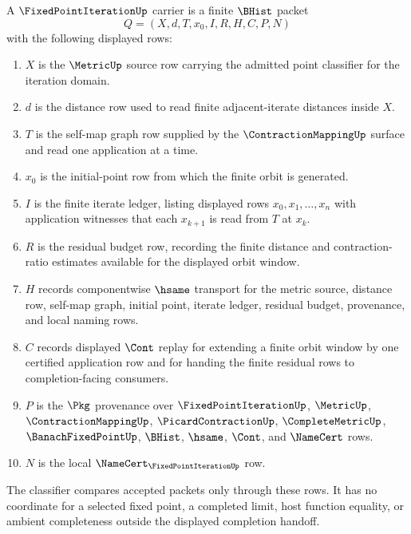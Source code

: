 \begin{definition}
\label{def:fixed-point-iteration-carrier}
A $\FixedPointIterationUp$ carrier is a finite $\BHist$ packet
$$
Q=(X,d,T,x_0,I,R,H,C,P,N)
$$
with the following displayed rows:
\begin{enumerate}
\item $X$ is the $\MetricUp$ source row carrying the admitted point classifier for the iteration domain.
\item $d$ is the distance row used to read finite adjacent-iterate distances inside $X$.
\item $T$ is the self-map graph row supplied by the $\ContractionMappingUp$ surface and read one application at a time.
\item $x_0$ is the initial-point row from which the finite orbit is generated.
\item $I$ is the finite iterate ledger, listing displayed rows $x_0,x_1,\ldots,x_n$ with application witnesses that each $x_{k+1}$ is read from $T$ at $x_k$.
\item $R$ is the residual budget row, recording the finite distance and contraction-ratio estimates available for the displayed orbit window.
\item $H$ records componentwise $\hsame$ transport for the metric source, distance row, self-map graph, initial point, iterate ledger, residual budget, provenance, and local naming rows.
\item $C$ records displayed $\Cont$ replay for extending a finite orbit window by one certified application row and for handing the finite residual rows to completion-facing consumers.
\item $P$ is the $\Pkg$ provenance over $\FixedPointIterationUp$, $\MetricUp$, $\ContractionMappingUp$, $\PicardContractionUp$, $\CompleteMetricUp$, $\BanachFixedPointUp$, $\BHist$, $\hsame$, $\Cont$, and $\NameCert$ rows.
\item $N$ is the local $\NameCert_{\FixedPointIterationUp}$ row.
\end{enumerate}
The classifier compares accepted packets only through these rows. It has no coordinate for a selected fixed point, a completed limit, host function equality, or ambient completeness outside the displayed completion handoff.
\end{definition}

